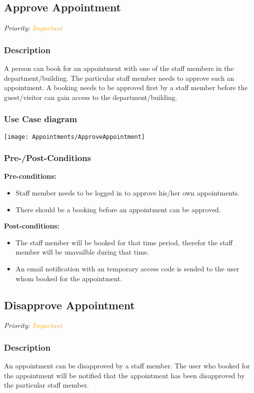 \subsection{Approve Appointment}
\textit{Priority: \textcolor{orange}{Important}} 

\subsubsection{Description}
A person can book for an appointment with one of the staff members in the department/building. The particular staff member needs to approve such an appointment. A booking needs to be approved first by a staff member before the guest/visitor can gain access to the department/building.

\subsubsection{Use Case diagram}
\texttt{[image: Appointments/ApproveAppointment]}

\subsubsection{Pre-/Post-Conditions}
\textbf{Pre-conditions:} 
	\begin{itemize}
		\item Staff member needs to be logged in to approve his/her own appointments.
		\item There should be a booking before an appointment can be approved.
	\end{itemize}
\textbf{ Post-conditions:} 
	\begin{itemize}
		\item The staff member will be booked for that time period, therefor the staff member will be unavailble during that time.
		\item An email notification with an temporary access code is sended to the user whom booked for the appointment.
	\end{itemize}

\subsection{Disapprove Appointment}
\textit{Priority: \textcolor{orange}{Important}}

\subsubsection{Description}
An appointment can be disapproved by a staff member. The user who booked for the appointment will be notified that the appointment has been disapproved by the particular staff member. 

